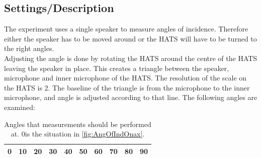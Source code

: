 \subsection{Settings/Description}
The experiment uses a single speaker to measure angles of incidence. Therefore either the speaker has to be moved around or the HATS will have to be turned to the right angles. \\
Adjusting the angle is done by rotating the HATS around the centre of the HATS leaving the speaker in place. This creates a triangle between the speaker, microphone and inner microphone of the HATS. The resolution of the scale on the HATS is 2\degrees. The baseline of the triangle is from the microphone to the inner microphone, and angle is adjusted according to that line.
The following angles are examined:
\begin{table}[H]
	\centering
	\begin{tabular}{c c c c c c c c c c} \toprule
		0\degrees & 10\degrees & 20\degrees & 30\degrees & 40\degrees & 50\degrees & 60\degrees & 70\degrees & 80\degrees & 90\degrees \\ \bottomrule
	\end{tabular}
\label{Tab:AngleOfInciMeasAngles}
\caption{Angles that measurements should be performed at. 0\degrees  is the situation in \autoref{fig:AngOfIndOnax}.}
\end{table}
 

